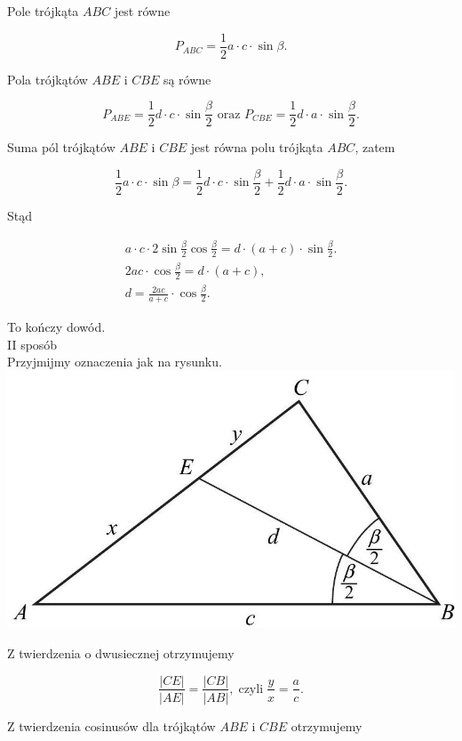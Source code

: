 \documentclass[10pt]{article}
\begin{document}
Pole trójkąta $A B C$ jest równe

$$
P_{A B C}=\frac{1}{2} a \cdot c \cdot \sin \beta .
$$

Pola trójkątów $A B E$ i $C B E$ są równe

$$
P_{A B E}=\frac{1}{2} d \cdot c \cdot \sin \frac{\beta}{2} \text { oraz } P_{C B E}=\frac{1}{2} d \cdot a \cdot \sin \frac{\beta}{2} .
$$

Suma pól trójkątów $A B E$ i $C B E$ jest równa polu trójkąta $A B C$, zatem

$$
\frac{1}{2} a \cdot c \cdot \sin \beta=\frac{1}{2} d \cdot c \cdot \sin \frac{\beta}{2}+\frac{1}{2} d \cdot a \cdot \sin \frac{\beta}{2} .
$$

Stąd

$$
\begin{gathered}
a \cdot c \cdot 2 \sin \frac{\beta}{2} \cos \frac{\beta}{2}=d \cdot(a+c) \cdot \sin \frac{\beta}{2} . \\
2 a c \cdot \cos \frac{\beta}{2}=d \cdot(a+c), \\
d=\frac{2 a c}{a+c} \cdot \cos \frac{\beta}{2} .
\end{gathered}
$$

To kończy dowód.\\
II sposób\\
Przyjmijmy oznaczenia jak na rysunku.\\
\includegraphics[max width=\textwidth, center]{2025_02_07_cd06b1485e4d114dda29g-08}

Z twierdzenia o dwusiecznej otrzymujemy

$$
\frac{|C E|}{|A E|}=\frac{|C B|}{|A B|}, \operatorname{czyli} \frac{y}{x}=\frac{a}{c} .
$$

Z twierdzenia cosinusów dla trójkątów $A B E$ i $C B E$ otrzymujemy
\end{document}
